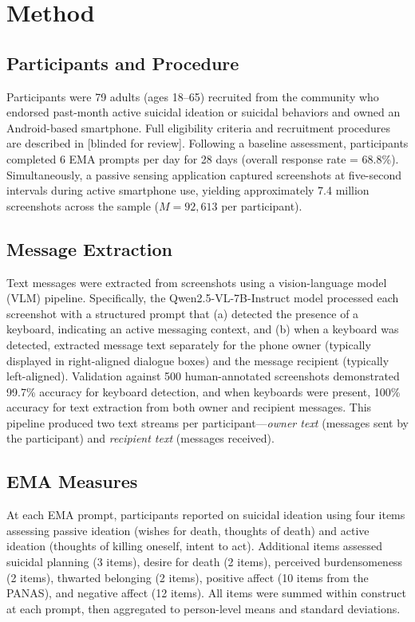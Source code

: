\documentclass[review,12pt,authoryear]{elsarticle}
\begin{document}
\section{Method}

\subsection{Participants and Procedure}

Participants were 79 adults (ages 18--65) recruited from the community who endorsed past-month active suicidal ideation or suicidal behaviors and owned an Android-based smartphone. Full eligibility criteria and recruitment procedures are described in [blinded for review]. Following a baseline assessment, participants completed 6 EMA prompts per day for 28 days (overall response rate = 68.8\%). Simultaneously, a passive sensing application captured screenshots at five-second intervals during active smartphone use, yielding approximately 7.4 million screenshots across the sample ($M = 92{,}613$ per participant).

\subsection{Message Extraction}

Text messages were extracted from screenshots using a vision-language model (VLM) pipeline. Specifically, the Qwen2.5-VL-7B-Instruct model \citep{qwen2025qwen3} processed each screenshot with a structured prompt that (a) detected the presence of a keyboard, indicating an active messaging context, and (b) when a keyboard was detected, extracted message text separately for the phone owner (typically displayed in right-aligned dialogue boxes) and the message recipient (typically left-aligned). Validation against 500 human-annotated screenshots demonstrated 99.7\% accuracy for keyboard detection, and when keyboards were present, 100\% accuracy for text extraction from both owner and recipient messages. This pipeline produced two text streams per participant---\textit{owner text} (messages sent by the participant) and \textit{recipient text} (messages received).

\subsection{EMA Measures}

At each EMA prompt, participants reported on suicidal ideation using four items assessing passive ideation (wishes for death, thoughts of death) and active ideation (thoughts of killing oneself, intent to act). Additional items assessed suicidal planning (3 items), desire for death (2 items), perceived burdensomeness (2 items), thwarted belonging (2 items), positive affect (10 items from the PANAS), and negative affect (12 items). All items were summed within construct at each prompt, then aggregated to person-level means and standard deviations.
\end{document}
